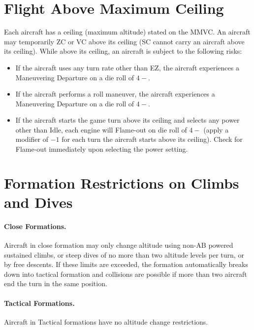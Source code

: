 \begin{advancedrules}
\section{Flight Above Maximum Ceiling}

Each aircraft has a ceiling (maximum altitude) stated on the MMVC. An aircraft may temporarily ZC or VC above its ceiling (SC cannot carry an aircraft above its ceiling). While above its ceiling, an aircraft is subject to the following risks:

\begin{itemize}

    \item If the aircraft uses any turn rate other than EZ, the aircraft experiences a Maneuvering Departure on a die roll of $4-$.
    
    \item If the aircraft performs a roll maneuver, the aircraft experiences a Maneuvering Departure on a die roll of $4-$.

    \item If the aircraft starts the game turn above its ceiling and selects any power other than Idle, each engine will Flame-out on die roll of $4-$ (apply a modifier of $-1$ for each turn the aircraft starts above its ceiling). Check for Flame-out immediately upon selecting the power setting.

\end{itemize}

\section{Formation Restrictions on Climbs and Dives}

\paragraph{Close Formations.} Aircraft in close formation may only change altitude using non-AB powered sustained climbs, or steep dives of no more than two altitude levels per turn, or by free descents. If these limits are exceeded, the formation automatically breaks down into tactical formation and collisions are possible if more than two aircraft end the turn in the same position.

\paragraph{Tactical Formations.} Aircraft in Tactical formations have no altitude change restrictions.

\end{advancedrules}
